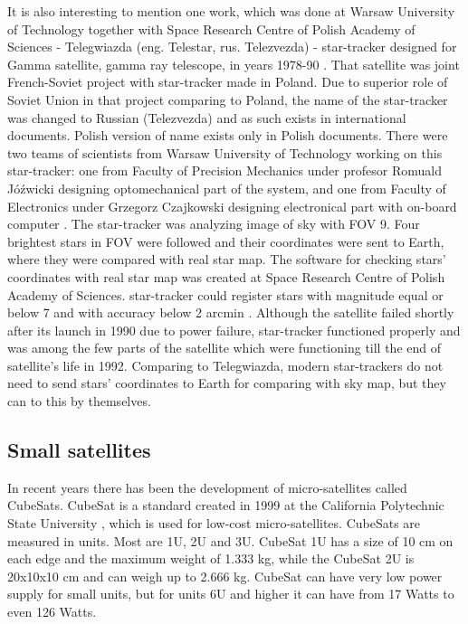 \documentclass[12pt,a4paper,twoside]{article}
\begin{document}
It is also interesting to mention one work, which was done at Warsaw University of Technology together with Space Research Centre of Polish Academy of Sciences - Telegwiazda (eng. Telestar, rus. Telezvezda) - star-tracker designed for Gamma satellite, gamma ray telescope, in years 1978-90 \cite{gamma-satellite}. That satellite was joint French-Soviet project with star-tracker made in Poland. Due to superior role of Soviet Union in that project comparing to Poland, the name of the star-tracker was changed to Russian (Telezvezda) and as such exists in international documents. Polish version of name exists only in Polish documents. There were two teams of scientists from Warsaw University of Technology working on this star-tracker: one from Faculty of Precision Mechanics under profesor Romuald Jóźwicki designing optomechanical part of the system, and one from Faculty of Electronics under Grzegorz Czajkowski designing electronical part with on-board computer \cite{wut-space-research}. 
The star-tracker was analyzing image of sky with FOV 9\degree . Four brightest stars in FOV were followed and their coordinates were sent to Earth, where they were compared with real star map. The software for checking stars' coordinates with real star map was created at Space Research Centre of Polish Academy of Sciences. star-tracker could register stars with magnitude equal or below 7 and with accuracy below 2 arcmin \cite{optical-devices-cbk}. Although the satellite failed shortly after its launch in 1990 due to power failure, star-tracker functioned properly and was among the few parts of the satellite which were functioning till the end of satellite's life in 1992. Comparing to Telegwiazda, modern star-trackers do not need to send stars' coordinates to Earth for comparing with sky map, but they can to this by themselves.


\subsection{Small satellites}

In recent years there has been the development of micro-satellites called CubeSats. CubeSat is a standard created in 1999 at the California Polytechnic State University \cite{heidt2000cubesat}, which is used for low-cost micro-satellites. CubeSats are measured in units. Most are 1U, 2U and 3U. CubeSat 1U has a size of 10 cm on each edge and the maximum weight of 1.333 kg, while the CubeSat 2U is 20x10x10 cm and can weigh up to 2.666 kg. CubeSat can have very low power supply for small units, but for units 6U and higher it can have from 17 Watts\cite{cubesat-panels} to even 126 Watts\cite{nanosat-tables}.
\end{document}
